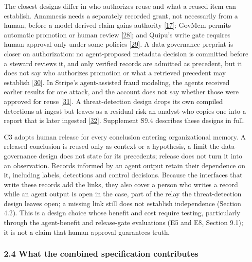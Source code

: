 \documentclass[
  11pt,
]{article}
\begin{document}
The closest designs differ in who authorizes reuse and what a reused
item can establish. Anamnesis needs a separately recorded grant, not
necessarily from a human, before a model-derived claim gains authority
{[}\protect\hyperlink{ref-Dan2026Anamnesis}{17}{]}; GovMem permits
automatic promotion or human review
{[}\protect\hyperlink{ref-Qi2026GovMem}{28}{]}; and Quipu's write gate
requires human approval only under some policies
{[}\protect\hyperlink{ref-Brown2026Quipu}{29}{]}. A data-governance
preprint is closer on authorization: no agent-proposed metadata decision
is committed before a steward reviews it, and only verified records are
admitted as precedent, but it does not say who authorizes promotion or
what a retrieved precedent may establish
{[}\protect\hyperlink{ref-Akhtar2026Contestable}{30}{]}. In Stripe's
agent-assisted fraud modeling, the agents received earlier results for
one attack, and the account does not say whether those were approved for
reuse {[}\protect\hyperlink{ref-Drapeau2026ScalingRadar}{31}{]}. A
threat-detection design drops its own compiled detections at ingest but
leaves as a residual risk an analyst who copies one into a report that
is later ingested
{[}\protect\hyperlink{ref-Evron2026AdversaryBrains}{32}{]}. Supplement
S9.4 describes these designs in full.

C3 adopts human release for every conclusion entering organizational
memory. A released conclusion is reused only as context or a hypothesis,
a limit the data-governance design does not state for its precedents;
release does not turn it into an observation. Records informed by an
agent output retain their dependence on it, including labels, detections
and control decisions. Because the interfaces that write these records
add the links, they also cover a person who writes a record while an
agent output is open in the case, part of the relay the threat-detection
design leaves open; a missing link still does not establish independence
(Section 4.2). This is a design choice whose benefit and cost require
testing, particularly through the agent-benefit and release-gate
evaluations (E5 and E8, Section 9.1); it is not a claim that human
approval guarantees truth.

\hypertarget{what-the-combined-specification-contributes}{%
\subsubsection{2.4 What the combined specification
contributes}\label{what-the-combined-specification-contributes}}
\end{document}

